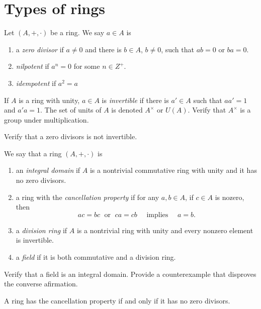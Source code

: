 \documentclass[11pt,a4paper]{article}
\begin{document}
\section{Types of rings}

Let $(A,+,\cdot)$ be a ring. We say \(a\in A\) is 

\begin{enumerate}[label=(\roman*)]
\item a \textit{zero divisor} if \(a\neq 0\) and there is \(b \in A\), \(b\neq 0\), such that \(ab = 0\) or \(ba=0\).
\item \textit{nilpotent}  if \(a^n = 0\) for some \(n\in Z^+\).
\item \textit{idempotent} if \(a^2 = a\)
\end{enumerate}

If \(A\) is a ring with unity, \(a\in A\) is \textit{invertible} if there is \(a'\in A\) such that \(aa' = 1\) and \(a'a=1\).
The set of units of \(A\) is denoted \(A^\times \) or \(U(A)\). Verify that \(A^\times\) is a group under multiplication.

\begin{eje}
    Verify that a zero divisors is not invertible.
\end{eje}

We say that a ring $(A,+,\cdot)$
is 
\begin{enumerate}[label=(\roman*)]
\item an \textit{integral domain} if \(A\) is a nontrivial commutative ring with unity and it has no zero divisors.
\item a ring with the \textit{cancellation property} if for any \(a,b\in A\), if \(c\in A\) is nozero, then 
\[
ac=bc \;\text{ or }\; ca = cb \quad\text{ implies }\quad a=b.
\]

\item a \textit{division ring} if \(A\) is a nontrivial ring with unity and every nonzero element is invertible.
\item a \textit{field} if it is both commutative and   a division ring. 
\end{enumerate}

\begin{eje}
    Verify that a field is an integral domain.
    Provide a counterexample that disproves the converse afirmation.
\end{eje}

\begin{prop} 
A ring has the  cancellation property if and only if it has no zero divisors.
\end{prop} 
\end{document}
